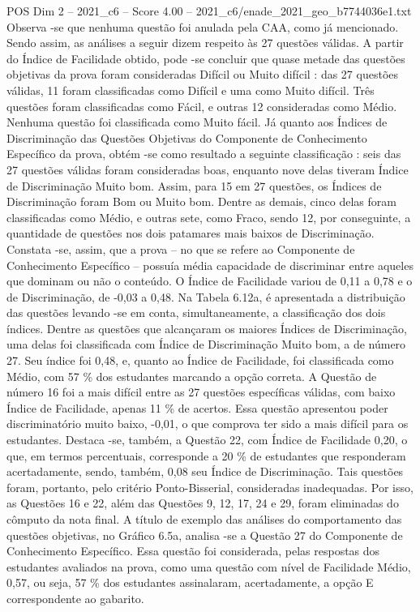 \begin{textsample}{POS Dim 2 – 2021\_c6 – Score 4.00 – 2021\_c6/enade\_2021\_geo\_b7744036e1.txt}
Observa -se que nenhuma questão foi anulada pela CAA, como já mencionado.
Sendo assim, as análises a seguir dizem respeito às 27 questões válidas.
A partir do Índice de Facilidade obtido, pode -se concluir que quase metade das questões objetivas da prova foram consideradas Difícil ou Muito difícil : das 27 questões válidas, 11 foram classificadas como Difícil e uma como Muito difícil.
Três questões foram classificadas como Fácil, e outras 12 consideradas como Médio.
Nenhuma questão foi classificada como Muito fácil.
Já quanto aos Índices de Discriminação das Questões Objetivas do Componente de Conhecimento Específico da prova, obtém -se como resultado a seguinte classificação : seis das 27 questões válidas foram consideradas boas, enquanto nove delas tiveram Índice de Discriminação Muito bom.
Assim, para 15 em 27 questões, os Índices de Discriminação foram Bom ou Muito bom.
Dentre as demais, cinco delas foram classificadas como Médio, e outras sete, como Fraco, sendo 12, por conseguinte, a quantidade de questões nos dois patamares mais baixos de Discriminação.
Constata -se, assim, que a prova – no que se refere ao Componente de Conhecimento Específico – possuía média capacidade de discriminar entre aqueles que dominam ou não o conteúdo.
O Índice de Facilidade variou de 0,11 a 0,78 e o de Discriminação, de -0,03 a 0,48.
Na Tabela 6.12a, é apresentada a distribuição das questões levando -se em conta, simultaneamente, a classificação dos dois índices.
Dentre as questões que alcançaram os maiores Índices de Discriminação, uma delas foi classificada com Índice de Discriminação Muito bom, a de número 27.
Seu índice foi 0,48, e, quanto ao Índice de Facilidade, foi classificada como Médio, com 57 \% dos estudantes marcando a opção correta.
A Questão de número 16 foi a mais difícil entre as 27 questões específicas válidas, com baixo Índice de Facilidade, apenas 11 \% de acertos.
Essa questão apresentou poder discriminatório muito baixo, -0,01, o que comprova ter sido a mais difícil para os estudantes.
Destaca -se, também, a Questão 22, com Índice de Facilidade 0,20, o que, em termos percentuais, corresponde a 20 \% de estudantes que responderam acertadamente, sendo, também, 0,08 seu Índice de Discriminação.
Tais questões foram, portanto, pelo critério Ponto-Bisserial, consideradas inadequadas.
Por isso, as Questões 16 e 22, além das Questões 9, 12, 17, 24 e 29, foram eliminadas do cômputo da nota final.
A título de exemplo das análises do comportamento das questões objetivas, no Gráfico 6.5a, analisa -se a Questão 27 do Componente de Conhecimento Específico.
Essa questão foi considerada, pelas respostas dos estudantes avaliados na prova, como uma questão com nível de Facilidade Médio, 0,57, ou seja, 57 \% dos estudantes assinalaram, acertadamente, a opção E correspondente ao gabarito.

\end{textsample}
